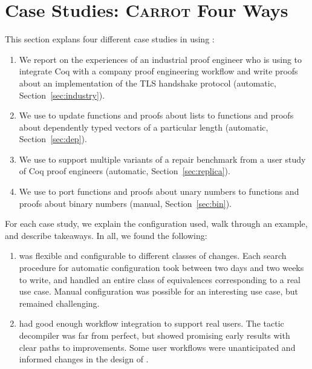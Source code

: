 \section{Case Studies: \textsc{Carrot} Four Ways}
\label{sec:search}

This section explans four different case studies in using \toolname:

\begin{enumerate}
\item We report on the experiences of an industrial proof engineer who is using \toolname to integrate Coq with a company proof engineering workflow and write proofs about an implementation of the TLS handshake protocol (automatic, Section~\ref{sec:industry}).
\item We use \toolname to update functions and proofs about lists to functions and proofs about dependently typed vectors of
a particular length (automatic, Section~\ref{sec:dep}).
\item We use \toolname to support multiple variants of a repair benchmark from a user study of Coq proof engineers (automatic, Section~\ref{sec:replica}).
\item We use \toolname to port functions and proofs about unary numbers to functions and proofs about binary numbers (manual, Section~\ref{sec:bin}).
\end{enumerate}
For each case study, we explain the configuration used, walk through an example, and describe takeaways.
In all, we found the following:

\begin{enumerate}
\item \toolname was flexible and configurable to different classes of changes. Each search procedure for automatic configuration
took between two days and two weeks to write, and handled an entire class of equivalences corresponding to a real use case.
Manual configuration was possible for an interesting use case, but remained challenging.
\item \toolname had good enough workflow integration to support real users.
The tactic decompiler was far from perfect, but showed promising early results with clear paths to improvements.
Some user workflows were unanticipated and informed changes in the design of \toolname.
\end{enumerate}


